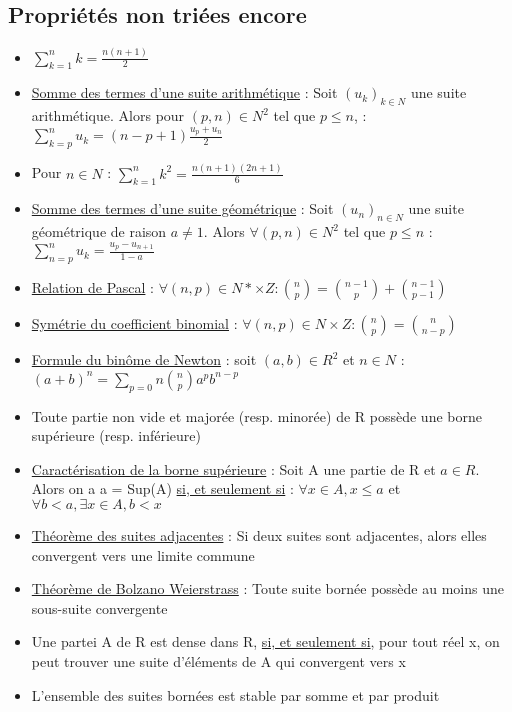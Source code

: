 \documentclass{article}
\begin{document}
\subsection{Propriétés non triées encore}

\begin{itemize}[label=$\ast$]
	\item \( \sum_{k=1}^{n}k = \frac{n(n+1)}{2} \)
	\item \underline{Somme des termes d'une suite arithmétique} : Soit \( (u_k)_{k \in N} \) une suite arithmétique. Alors pour \( (p,n) \in N^2 \) tel que \( p \leq n \), : \(  \sum_{k=p}^{n}u_k = (n-p+1) \frac{u_p + u_n}{2} \)
	\item Pour \(n \in N \) : \( \sum_{k=1}^n k^2 = \frac{n(n+1)(2n+1)}{6} \)
	\item \underline{Somme des termes d'une suite géométrique} : Soit \((u_n)_{n \in N} \) une suite géométrique de raison \( a \neq 1\). Alors \( \forall (p,n) \in N^2 \) tel que \(p \leq n \) : \( \sum_{n=p}^n u_k = \frac{u_p - u_{n+1}}{1-a} \)
	\item \underline{Relation de Pascal} : \( \forall{(n,p) \in N* \times Z} : \binom{n}{p} = \binom{n-1}{p} + \binom{n-1}{p-1} \)
	\item \underline{Symétrie du coefficient binomial} : \( \forall{(n,p) \in N \times Z} : \binom{n}{p} = \binom{n}{n-p} \)
	\item \underline{Formule du binôme de Newton} : soit \((a,b) \in R^2\) et \(n \in N\) : \((a+b)^n = \sum_{p=0}n \binom{n}{p}a^p b^{n-p} \)
	\item Toute partie non vide et majorée (resp. minorée) de R possède une borne supérieure (resp. inférieure)
	\item \underline{Caractérisation de la borne supérieure} : Soit A une partie de R et \(a \in R \). Alors on a a = Sup(A) \underline{si, et seulement si} : \( \forall x \in A, x \leq a\) et \( \forall b<a, \exists x \in A, b<x \)
	\item \underline{Théorème des suites adjacentes} : Si deux suites sont adjacentes, alors elles convergent vers une limite commune
	\item \underline{Théorème de Bolzano Weierstrass} : Toute suite bornée possède au moins une sous-suite convergente
 	\item Une partei A de R est dense dans R, \underline{si, et seulement si}, pour tout réel x, on peut trouver une suite d'éléments de A qui convergent vers x
	\item L'ensemble des suites bornées est stable par somme et par produit

\end{itemize}
\end{document}
